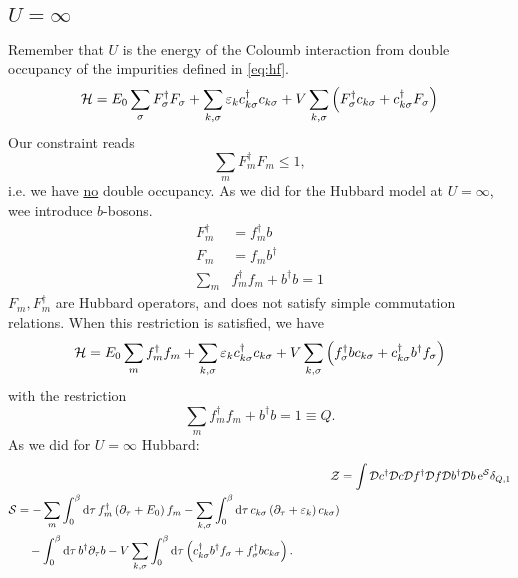 \subsection{$U = \infty$}
Remember that $U$ is the energy of the Coloumb interaction from double occupancy of the impurities defined in \eqref{eq:hf}.
\begin{equation}
	\mathcal{H} = E_0\sum_\sigma F_\sigma^\dagger F_\sigma + \sum_{k,\sigma}\varepsilon_k c_{k\sigma}^\dagger c_{k\sigma} + V\sum_{k,\sigma}\left(F_\sigma^\dagger c_{k\sigma} + c_{k\sigma}^\dagger F_\sigma\right)
\end{equation}
Our constraint reads
\begin{equation}
\sum_m F_m^\dagger F_m \le 1,
\end{equation}
i.e. we have \underline{no} double occupancy. As we did for the Hubbard model at $U = \infty$, wee introduce $b$-bosons.
\begin{align*}
	F_m^\dagger &= f_m^\dagger b \\
	F_m &= f_mb^\dagger\\
	\sum_m &f_m^\dagger f_m + b^\dagger b = 1
\end{align*}
$F_m, F_m^\dagger$ are Hubbard operators, and does not satisfy simple commutation relations. When this restriction is satisfied, we have
\begin{equation}
	\mathcal{H} = E_0\sum_m f_m^\dagger f_m + \sum_{k,\sigma}\varepsilon_k c_{k\sigma}^\dagger c_{k\sigma} + V\sum_{k,\sigma}\left(f_\sigma^\dagger bc_{k\sigma} + c_{k\sigma}^\dagger b^\dagger f_\sigma\right)
\end{equation}
with the restriction 
\begin{equation}
	\sum_m f_m^\dagger f_m + b^\dagger b = 1 \equiv Q.
\end{equation}
As we did for  $U=\infty$ Hubbard:
\begin{align}
	\mathcal{Z} &= \int\mathcal{D}c^\dagger\mathcal{D}c\mathcal{D}f^\dagger\mathcal{D}f\mathcal{D}b^\dagger\mathcal{D}b\,\mathrm{e}^{\mathcal{S}}\delta_{Q,1} \\
	\begin{split}
	\mathcal{S} &= -\sum_m\int_0^\beta \dd{\tau} f_m^\dagger\left(\partial_\tau + E_0\right)f_m - \sum_{k,\sigma}\int_0^\beta \dd{\tau} c_{k\sigma}\left(\partial_\tau + \varepsilon_k\right) c_{k\sigma}) \\
	&\quad -\int_0^\beta \dd{\tau}b^\dagger\partial_\tau b - V\sum_{k, \sigma}\int_0^\beta \dd{\tau}\left(c_{k\sigma}^\dagger b^\dagger f_\sigma + f_\sigma^\dagger b c_{k\sigma}\right).
	\end{split}
\end{align}
